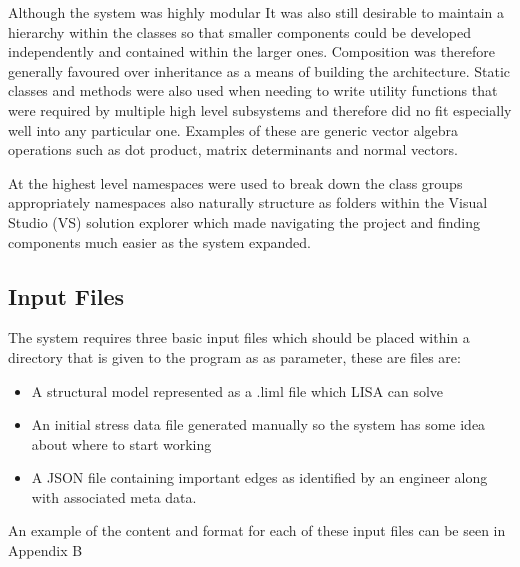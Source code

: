 \noindent
Although the system was highly modular It was also still desirable to maintain a hierarchy within the classes so that smaller components could be developed independently and contained within the larger ones. Composition was therefore generally favoured over inheritance as a means of building the architecture. Static classes and methods were also used when needing to write utility functions that were required by multiple high level subsystems and therefore did no fit especially well into any particular one. Examples of these are generic vector algebra operations such as dot product, matrix determinants and normal vectors.

\noindent
At the highest level namespaces were used to break down the class groups appropriately namespaces also naturally structure as folders within the Visual Studio (VS) solution explorer which made navigating the project and finding components much easier as the system expanded.





\subsection{Input Files}
The system requires three basic input files which should be placed within a directory that is given to the program as as parameter, these are files are:

\begin{itemize}
\item A structural model represented as a .liml file which LISA can solve
\item An initial stress data file generated manually so the system has some idea about where to start working
\item A JSON file containing important edges as identified by an engineer 
along with associated meta data.
\end{itemize}

An example of the content and format for each of these input files can be seen in Appendix B

